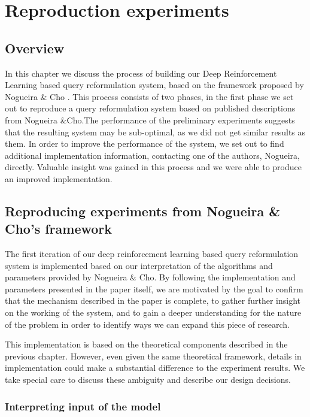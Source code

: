 \chapter{Reproduction experiments}
\label{chap:implementation}

\section{Overview}

In this chapter we discuss the process of building our Deep Reinforcement Learning based query reformulation system, based on the framework proposed by Nogueira \& Cho \cite{nogueira2017task}. This process consists of two phases, in the first phase we set out to reproduce a query reformulation system based on published descriptions from Nogueira \&Cho.The performance of the preliminary experiments suggests that the resulting system may be sub-optimal, as we did not get similar results as them. In order to improve the performance of the system, we set out to find additional implementation information, contacting one of the authors, Nogueira, directly. Valuable insight was gained in this process and we were able to produce an improved implementation.



\section{Reproducing experiments from  Nogueira \& Cho's framework}


The first iteration of our deep reinforcement learning based query reformulation system is implemented based on our interpretation of the algorithms and parameters provided by Nogueira \& Cho\cite{nogueira2017task}. By following the implementation and parameters presented in the paper itself, we are motivated by the goal to confirm that the mechanism described in the paper is complete, to gather further insight on the working of the system, and to gain a deeper understanding for the nature of the problem in order to identify ways we can expand this piece of research.

This implementation is based on the theoretical components described in the previous chapter. However, even given the same theoretical framework, details in implementation could make a substantial difference to the experiment results. We take special care to discuss these ambiguity and describe our design decisions.

\subsection{Interpreting input of the model}

